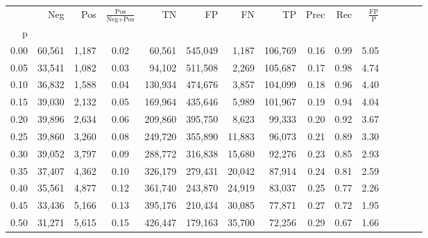 \begin{tabular}{rrrcrrrrrrrrrrr}
\toprule
{} &     Neg &     Pos & $\frac{\text{Pos}}{\text{Neg}+\text{Pos}}$ &       TN &       FP &       FN &       TP &  Prec &   Rec & $\frac{\text{FP}}{\text{P}}$ \\
p    &         &         &                                            &          &          &          &          &       &       &                              \\
\midrule
0.00 &  60,561 &   1,187 &                                       0.02 &   60,561 &  545,049 &    1,187 &  106,769 &  0.16 &  0.99 &                         5.05 \\
0.05 &  33,541 &   1,082 &                                       0.03 &   94,102 &  511,508 &    2,269 &  105,687 &  0.17 &  0.98 &                         4.74 \\
0.10 &  36,832 &   1,588 &                                       0.04 &  130,934 &  474,676 &    3,857 &  104,099 &  0.18 &  0.96 &                         4.40 \\
0.15 &  39,030 &   2,132 &                                       0.05 &  169,964 &  435,646 &    5,989 &  101,967 &  0.19 &  0.94 &                         4.04 \\
0.20 &  39,896 &   2,634 &                                       0.06 &  209,860 &  395,750 &    8,623 &   99,333 &  0.20 &  0.92 &                         3.67 \\
0.25 &  39,860 &   3,260 &                                       0.08 &  249,720 &  355,890 &   11,883 &   96,073 &  0.21 &  0.89 &                         3.30 \\
0.30 &  39,052 &   3,797 &                                       0.09 &  288,772 &  316,838 &   15,680 &   92,276 &  0.23 &  0.85 &                         2.93 \\
0.35 &  37,407 &   4,362 &                                       0.10 &  326,179 &  279,431 &   20,042 &   87,914 &  0.24 &  0.81 &                         2.59 \\
0.40 &  35,561 &   4,877 &                                       0.12 &  361,740 &  243,870 &   24,919 &   83,037 &  0.25 &  0.77 &                         2.26 \\
0.45 &  33,436 &   5,166 &                                       0.13 &  395,176 &  210,434 &   30,085 &   77,871 &  0.27 &  0.72 &                         1.95 \\
0.50 &  31,271 &   5,615 &                                       0.15 &  426,447 &  179,163 &   35,700 &   72,256 &  0.29 &  0.67 &                         1.66 \\

\end{tabular}
